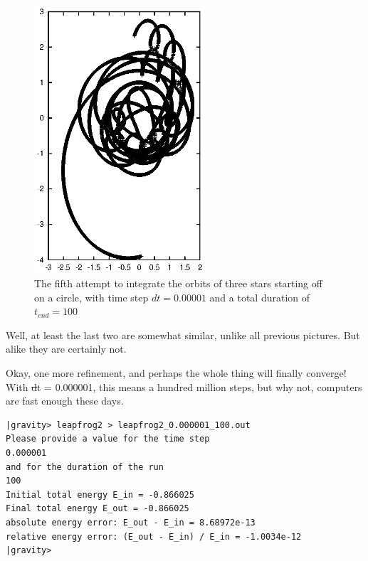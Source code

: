\begin{figure}[htb]
\centering
\includegraphics[width=2.5in]{chap5/leapfrog2_0.00001_100.ps}
\caption[Three stars on a circle, leapfrog, $dt = 0.00001$, $t_{end} = 100$]
{The fifth attempt to integrate the orbits of three stars
starting off on a circle, with time step $dt = 0.00001$ and a total
duration of $t_{end} = 100$}
\label{fig:leap2-0.00001-100}
\end{figure}

\abc

\alice
Well, at least the last two are somewhat similar, unlike all previous
pictures.  But alike they are certainly not.

\bob
Okay, one more refinement, and perhaps the whole thing will finally
converge!  With {\st dt = 0.000001}, this means a hundred million steps,
but why not, computers are fast enough these days.

\cba

\begin{small}
\begin{verbatim}
|gravity> leapfrog2 > leapfrog2_0.000001_100.out
Please provide a value for the time step
0.000001
and for the duration of the run
100
Initial total energy E_in = -0.866025
Final total energy E_out = -0.866025
absolute energy error: E_out - E_in = 8.68972e-13
relative energy error: (E_out - E_in) / E_in = -1.0034e-12
|gravity>
\end{verbatim}
\end{small}

